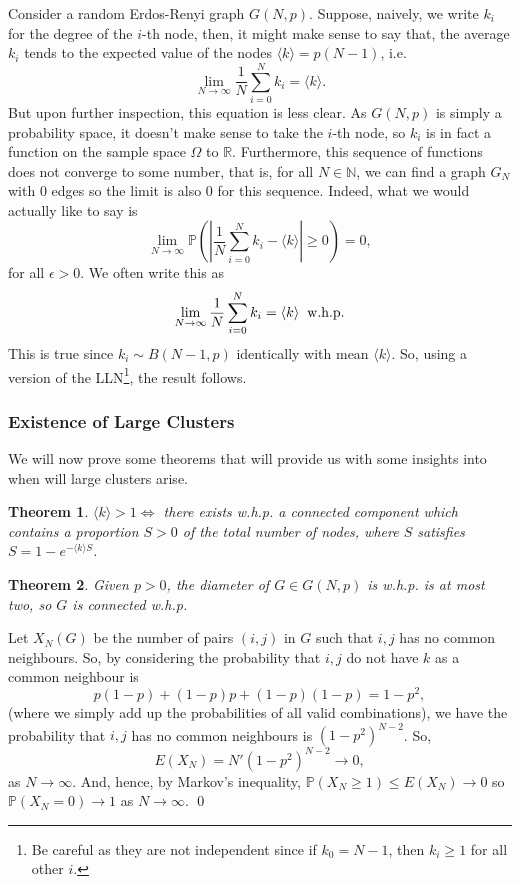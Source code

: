 \documentclass[
]{article}
\newtheorem{theorem}{Theorem}
\theoremstyle{definition}
\begin{document}
Consider a random Erdos-Renyi graph \(G(N, p)\). Suppose, naively, we
write \(k_i\) for the degree of the \(i\)-th node, then, it might make
sense to say that, the average \(k_i\) tends to the expected value of
the nodes \(\langle k \rangle = p(N - 1)\), i.e.
\[\lim_{N \to \infty} \frac{1}{N} \sum_{i = 0}^N k_i = \langle k \rangle.\]
But upon further inspection, this equation is less clear. As \(G(N, p)\)
is simply a probability space, it doesn't make sense to take the
\(i\)-th node, so \(k_i\) is in fact a function on the sample space
\(\Omega\) to \(\mathbb{R}\). Furthermore, this sequence of functions
does not converge to some number, that is, for all \(N \in \mathbb{N}\),
we can find a graph \(G_N\) with \(0\) edges so the limit is also \(0\)
for this sequence. Indeed, what we would actually like to say is
\[\lim_{N \to \infty} \mathbb{P} \left( \left| \frac{1}{N}\sum_{i = 0}^N k_i - 
  \langle k \rangle \right| \ge 0 \right) = 0, \] for all
\(\epsilon > 0\). We often write this as
\[\lim_{N \to \infty} \frac{1}{N} \sum_{i = 0}^N k_i = \langle k \rangle 
  \hspace{2mm} \text{w.h.p}.\] This is true since
\(k_i \sim B(N - 1, p)\) identically with mean \(\langle k \rangle\).
So, using a version of the
LLN\footnote{Be careful as they are not independent 
since if \(k_0 = N - 1\), then \(k_i \ge 1\) for all other \(i\).}, the
result follows.

\hypertarget{existence-of-large-clusters}{%
\subsubsection{Existence of Large
Clusters}\label{existence-of-large-clusters}}

We will now prove some theorems that will provide us with some insights
into when will large clusters arise.

\begin{theorem}
  \(\langle k \rangle > 1 \iff\) there exists w.h.p. a connected component which 
  contains a proportion \(S > 0\) of the total number of nodes, where \(S\) 
  satisfies \(S = 1 - e^{-\langle k \rangle S}\).
\end{theorem}

\begin{theorem}
  Given \(p > 0\), the diameter of \(G \in G(N, p)\) is w.h.p. is at most two, 
  so \(G\) is connected w.h.p.
\end{theorem}
\proof

Let \(X_N(G)\) be the number of pairs \((i, j)\) in \(G\) such that
\(i, j\) has no common neighbours. So, by considering the probability
that \(i, j\) do not have \(k\) as a common neighbour is
\[ p(1 - p) + (1 - p)p + (1- p)(1 - p) = 1 - p^2,\] (where we simply add
up the probabilities of all valid combinations), we have the probability
that \(i ,j\) has no common neighbours is \((1 - p^2)^{N - 2}\). So,
\[E(X_N) = N'(1 - p^2)^{N - 2} \to 0,\] as \(N \to \infty\). And, hence,
by Markov's inequality, \(\mathbb{P}(X_N \ge 1) \le E(X_N) \to 0\) so
\(\mathbb{P}(X_N = 0) \to 1\) as \(N \to \infty\). \qed
\end{document}

